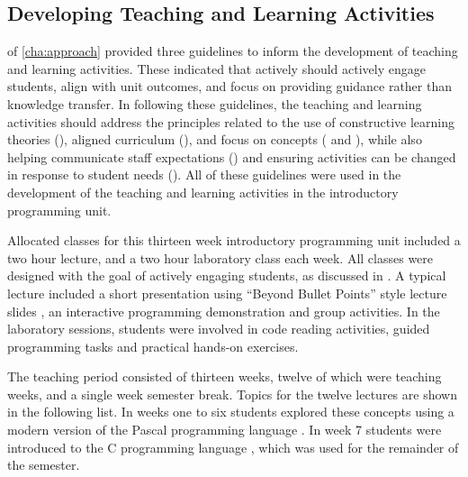 
\subsection{Developing Teaching and Learning Activities} %
\label{sub:intro_developing_teaching_and_learning_activities}

 of \cref{cha:approach} provided three guidelines to inform the development of teaching and learning activities. These indicated that actively should actively engage students, align with unit outcomes, and focus on providing guidance rather than knowledge transfer. In following these guidelines, the teaching and learning activities should address the principles related to the use of constructive learning theories (), aligned curriculum (), and focus on concepts ( and ), while also helping communicate staff expectations () and ensuring activities can be changed in response to student needs (). All of these guidelines were used in the development of the teaching and learning activities in the introductory programming unit.

Allocated classes for this thirteen week introductory programming unit included a two hour lecture, and a two hour laboratory class each week. All classes were designed with the goal of actively engaging students, as discussed in . A typical lecture included a short presentation using ``Beyond Bullet Points'' style lecture slides \cite{Atkinson:2007}, an interactive programming demonstration and group activities. In the laboratory sessions, students were involved in code reading activities, guided programming tasks and practical hands-on exercises.

The teaching period consisted of thirteen weeks, twelve of which were teaching weeks, and a single week semester break. Topics for the twelve lectures are shown in the following list. In weeks one to six students explored these concepts using a modern version of the Pascal programming language \cite{Wirth:1971,FPC:2011}. In week 7 students were introduced to the C programming language \cite{Ritchie:1978}, which was used for the remainder of the semester. 

